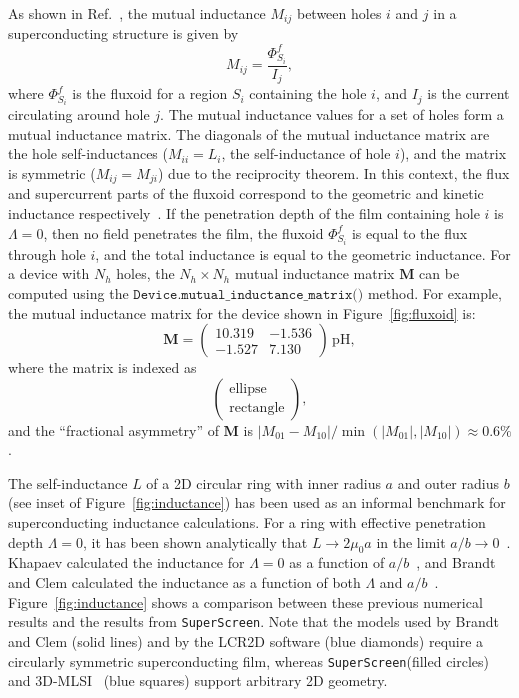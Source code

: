 \documentclass[final,3p,times,twocolumn]{elsarticle}
\newcommand{\inline}[1]{\texttt{#1}\xspace}
\newcommand{\SuperScreen}{\inline{SuperScreen}}
\begin{document}
As shown in Ref.~\cite{Brandt2005-wj}, the mutual inductance $M_{ij}$ between holes $i$ and $j$ in a superconducting structure is given by
\begin{equation}
    M_{ij}=\frac{\Phi^f_{S_i}}{I_j},
\end{equation}
where $\Phi^f_{S_i}$ is the fluxoid for a region $S_i$ containing the hole $i$, and $I_j$ is the current circulating around hole $j$. The mutual inductance values for a set of holes form a mutual inductance matrix. The diagonals of the mutual inductance matrix are the hole self-inductances ($M_{ii}=L_i$, the self-inductance of hole $i$), and the matrix is symmetric ($M_{ij}=M_{ji}$) due to the reciprocity theorem. In this context, the flux and supercurrent parts of the fluxoid correspond to the geometric and kinetic inductance respectively~\cite{Brandt2004-ew}. If the penetration depth of the film containing hole $i$ is $\Lambda = 0$, then no field penetrates the film, the fluxoid $\Phi^f_{S_i}$ is equal to the flux through hole $i$, and the total inductance is equal to the geometric inductance. For a device with $N_h$ holes, the $N_h\times N_h$ mutual inductance matrix $\mathbf{M}$ can be computed using the $\inline{Device.mutual_inductance_matrix()}$ method. For example, the mutual inductance matrix for the device shown in Figure~\ref{fig:fluxoid} is:
\begin{equation*}
    \mathbf{M} = 
    \begin{pmatrix}
    	10.319 & -1.536 \\
        -1.527 & 7.130
    \end{pmatrix}
    \,\mathrm{pH},
\end{equation*}
where the matrix is indexed as $$\begin{pmatrix}\text{ellipse}\\\text{rectangle}\end{pmatrix},$$
and the ``fractional asymmetry'' of $\mathbf{M}$ is $|M_{01} - M_{10}| / \min(|M_{01}|, |M_{10}|)\approx 0.6\%$.

The self-inductance $L$ of a 2D circular ring with inner radius $a$ and outer radius $b$ (see inset of Figure~\ref{fig:inductance}) has been used as an informal benchmark for superconducting inductance calculations. For a ring with effective penetration depth $\Lambda = 0$, it has been shown analytically that $L\to 2\mu_0 a$ in the limit $a/b\to 0$~\cite{Ketchen2012-mb, Babaei_Brojeny2003-la}. Khapaev calculated the inductance for $\Lambda = 0$ as a function of $a/b$~\cite{Khapaev1997-kw}, and Brandt and Clem calculated the inductance as a function of both $\Lambda$ and $a / b$~\cite{Brandt2004-ew}. Figure~\ref{fig:inductance} shows a comparison between these previous numerical results and the results from \SuperScreen. Note that the models used by Brandt and Clem (solid lines) and by the LCR2D software (blue diamonds) require a circularly symmetric superconducting film, whereas \SuperScreen (filled circles) and 3D-MLSI~\cite{Khapaev1997-kw} (blue squares) support arbitrary 2D geometry. 
\end{document}
